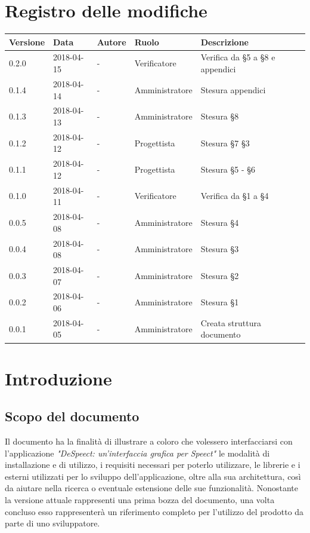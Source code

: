 \documentclass[openany,12pt,a4paper]{report}
\begin{document}
	\chapter*{Registro delle modifiche}
	\setlength\LTleft{-22mm}
	\begin{longtable}{|p{20mm}|p{20mm}|p{40mm}|p{30mm}|p{50mm}|}
		\hline
		\textbf{Versione} & \textbf{Data} & \textbf{Autore} & \textbf{Ruolo} & \textbf{Descrizione} \\
		
		\hline 0.2.0 & 2018-04-15 & - & Verificatore & Verifica da §5 a §8 e appendici \\
		\hline 0.1.4 & 2018-04-14 & - & Amministratore & Stesura appendici \\
		\hline 0.1.3 & 2018-04-13 & - & Amministratore & Stesura §8 \\
		\hline 0.1.2 & 2018-04-12 & - & Progettista & Stesura §7 §3 \\		
		\hline 0.1.1 & 2018-04-12 & - & Progettista & Stesura §5 - §6 \\
		\hline 0.1.0 & 2018-04-11 & - & Verificatore & Verifica da §1 a §4 \\
		\hline 0.0.5 & 2018-04-08 & - & Amministratore & Stesura §4 \\	
		\hline 0.0.4 & 2018-04-08 & - & Amministratore & Stesura §3 \\
		\hline 0.0.3 & 2018-04-07 & - & Amministratore & Stesura §2 \\
		\hline 0.0.2 & 2018-04-06 & - & Amministratore & Stesura §1 \\
		\hline 0.0.1 & 2018-04-05 & - & Amministratore & Creata struttura documento \\
		\hline
		
	\end{longtable}
	
	
	\tableofcontents
	
	
	\chapter{Introduzione}
	
	\section{Scopo del documento}
	
	Il documento ha la finalità di illustrare a coloro che volessero interfacciarsi con l’applicazione
	\textit{"DeSpeect: un'interfaccia grafica per Speect"} le modalità di installazione e di utilizzo, i requisiti necessari per poterlo utilizzare, le librerie e i  esterni utilizzati per lo sviluppo dell’applicazione,
	oltre alla sua architettura, così da aiutare
	nella ricerca o eventuale estensione delle sue funzionalità. Nonostante la versione attuale rappresenti una prima bozza del documento, una volta concluso esso rappresenterà un riferimento completo per l’utilizzo del prodotto da parte di uno sviluppatore.
	
\end{document}
